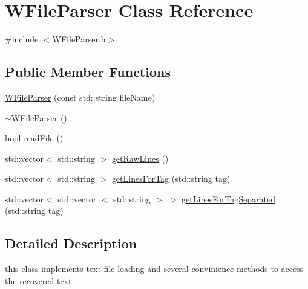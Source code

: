 \hypertarget{classWFileParser}{\section{\-W\-File\-Parser \-Class \-Reference}
\label{classWFileParser}
}


{\ttfamily \#include $<$\-W\-File\-Parser.\-h$>$}

\subsection*{\-Public \-Member \-Functions}
\begin{DoxyCompactItemize}
\item 
\hyperlink{classWFileParser_a7838bba397952de1e7844d10b36b11a3}{\-W\-File\-Parser} (const std\-::string file\-Name)
\item 
\hyperlink{classWFileParser_ab168f0a43963e4d0ea0d21935d96dd68}{$\sim$\-W\-File\-Parser} ()
\item 
bool \hyperlink{classWFileParser_a9032cf97623ab15701e38d7b1e728faa}{read\-File} ()
\item 
std\-::vector$<$ std\-::string $>$ \hyperlink{classWFileParser_a6eccded8bc8399d01aefb234c0a6d479}{get\-Raw\-Lines} ()
\item 
std\-::vector$<$ std\-::string $>$ \hyperlink{classWFileParser_ab76f068213508d9e6c269a844a754350}{get\-Lines\-For\-Tag} (std\-::string tag)
\item 
std\-::vector$<$ std\-::vector\*
$<$ std\-::string $>$ $>$ \hyperlink{classWFileParser_a43749562819e790e6826152d6a82b7e0}{get\-Lines\-For\-Tag\-Separated} (std\-::string tag)
\end{DoxyCompactItemize}


\subsection{\-Detailed \-Description}
this class implements text file loading and several convinience methods to access the recovered text 

